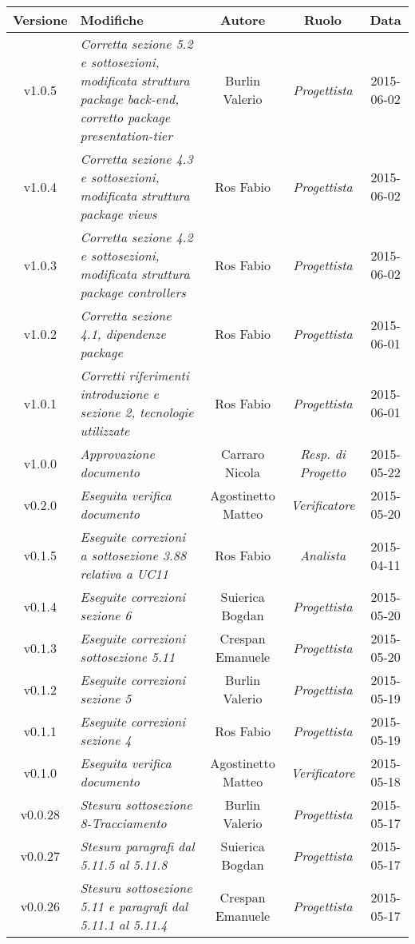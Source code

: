 \newpage

\begin{table}[h]
\centering
\begin{tabular}{|c|p{}|c|c|c|}
	\toprule
	\textbf{Versione} & \textbf{Modifiche} & \textbf{Autore} & \textbf{Ruolo} & \textbf{Data} \\
	\midrule
	\midrule
		v1.0.5 & \textit{Corretta sezione 5.2 e sottosezioni, modificata struttura package back-end, corretto package presentation-tier} & Burlin Valerio & \textit{Progettista} & 2015-06-02\\
	\midrule
		v1.0.4 & \textit{Corretta sezione 4.3 e sottosezioni, modificata struttura package views} & Ros Fabio & \textit{Progettista} & 2015-06-02\\
	\midrule
	v1.0.3 & \textit{Corretta sezione 4.2 e sottosezioni, modificata struttura package controllers} & Ros Fabio & \textit{Progettista} & 2015-06-02\\
	\midrule
	v1.0.2 & \textit{Corretta sezione 4.1, dipendenze package} & Ros Fabio & \textit{Progettista} & 2015-06-01\\
	\midrule
		v1.0.1 & \textit{Corretti riferimenti introduzione e sezione 2, tecnologie utilizzate} & Ros Fabio & \textit{Progettista} & 2015-06-01\\
	\midrule
		v1.0.0 & \textit{Approvazione documento} & Carraro Nicola & \textit{Resp. di Progetto} & 2015-05-22\\
	\midrule
		v0.2.0 & \textit{Eseguita verifica documento} & Agostinetto Matteo & \textit{Verificatore} & 2015-05-20\\
	\midrule
		v0.1.5 & \textit{Eseguite correzioni a sottosezione 3.88 relativa a UC11} & Ros Fabio & \textit{Analista} & 2015-04-11\\
	\midrule
		v0.1.4 & \textit{Eseguite correzioni sezione 6} & Suierica Bogdan & \textit{Progettista} & 2015-05-20\\
	\midrule
		v0.1.3 & \textit{Eseguite correzioni sottosezione 5.11} & Crespan Emanuele & \textit{Progettista} & 2015-05-20\\
	\midrule
		v0.1.2 & \textit{Eseguite correzioni sezione 5} & Burlin Valerio & \textit{Progettista} & 2015-05-19\\
	\midrule
		v0.1.1 & \textit{Eseguite correzioni sezione 4} & Ros Fabio & \textit{Progettista} & 2015-05-19\\
	\midrule
		v0.1.0 & \textit{Eseguita verifica documento} & Agostinetto Matteo & \textit{Verificatore} & 2015-05-18\\
	\midrule
		v0.0.28 & \textit{Stesura sottosezione 8-Tracciamento} & Burlin Valerio & \textit{Progettista} & 2015-05-17\\
	\midrule
		v0.0.27 & \textit{Stesura paragrafi dal 5.11.5 al 5.11.8} & Suierica Bogdan & \textit{Progettista} & 2015-05-17\\
	\midrule
		v0.0.26 & \textit{Stesura sottosezione 5.11 e paragrafi dal 5.11.1 al 5.11.4} & Crespan Emanuele & \textit{Progettista} & 2015-05-17\\
	\bottomrule
\end{tabular}
\end{table}

